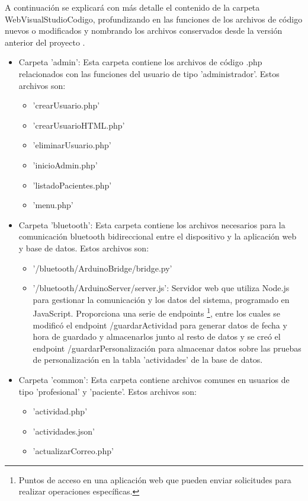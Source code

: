 A continuación se explicará con más detalle el contenido de la carpeta WebVisualStudioCodigo, profundizando en las funciones de los archivos de código nuevos o modificados y nombrando los archivos conservados desde la versión anterior del proyecto \cite{Martos2024}.
\begin{itemize}
    \item Carpeta 'admin': Esta carpeta contiene los archivos de código .php relacionados con las funciones del usuario de tipo 'administrador'. Estos archivos son:
    \begin{itemize}
        \item 'crearUsuario.php'
        \item 'crearUsuarioHTML.php'
        \item 'eliminarUsuario.php'
        \item 'inicioAdmin.php'
        \item 'listadoPacientes.php'
        \item 'menu.php'
    \end{itemize}
    \item Carpeta 'bluetooth': Esta carpeta contiene los archivos necesarios para la comunicación bluetooth bidireccional entre el dispositivo y la aplicación web y base de datos. Estos archivos son:
    \begin{itemize}
        \item '/bluetooth/ArduinoBridge/bridge.py'
        \item '/bluetooth/ArduinoServer/server.js': Servidor web que utiliza Node.js para gestionar la comunicación y los datos del sistema, programado en JavaScript. Proporciona una serie de endpoints \footnote{Puntos de acceso en una aplicación web que pueden enviar solicitudes para realizar operaciones específicas.}, entre los cuales se modificó el endpoint /guardarActividad para generar datos de fecha y hora de guardado y almacenarlos junto al resto de datos y se creó el endpoint /guardarPersonalización para almacenar datos sobre las pruebas de personalización en la tabla 'actividades' de la base de datos.
    \end{itemize}
    \item Carpeta 'common': Esta carpeta contiene archivos comunes en usuarios de tipo 'profesional' y 'paciente'. Estos archivos son:
    \begin{itemize}
        \item 'actividad.php'
        \item 'actividades.json'
        \item 'actualizarCorreo.php'

\end{itemize}
\end{itemize}
